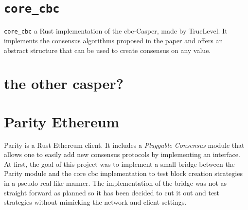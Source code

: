\section{\texttt{core\_cbc}}
\texttt{core\_cbc} a Rust implementation of the \gls{cbc}-Casper, made by
TrueLevel. It implements the consensus algorithms proposed in the paper and
offers an abstract structure that can be used to create consensus on any value.

\section{the other casper?}
\section{Parity Ethereum}
Parity is a Rust Ethereum client. It includes a \textit{Pluggable Consensus}
module that allows one to easily add new consensus protocols by implementing an
interface.  At first, the goal of this project was to implement a small bridge
between the Parity module and the core cbc implementation to test block creation
strategies in a pseudo real-like manner. The implementation of the bridge was
not as straight forward as planned so it has been decided to cut it out and test
strategies without mimicking the network and client settings.

